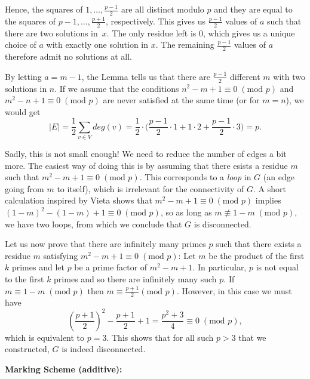 {Hence, the squares of $1, \dots, \frac{p-1}{2}$ are all distinct modulo $p$ and they are equal to the squares of $p-1, \dots, \frac{p+1}{2}$, respectively. This gives us $\frac{p-1}{2}$ values of $a$ such that there are two solutions \mbox{in $x$}.
The only residue left is $0$, which gives us a unique choice of $a$ with exactly one solution in $x$. The remaining $\frac{p-1}{2}$ values of $a$ therefore admit no solutions at all.

By letting $a = m-1$, the Lemma tells us that there are $\frac{p-1}{2}$ different $m$ with two solutions in $n$. If we assume that the conditions $n^2-m+1 \equiv 0 \; (\text{mod } p)$ and $m^2-n+1 \equiv 0 \; (\text{mod } p)$ are never satisfied at the same time (or for $m=n$), we would get
\[
\vert E \vert = \frac{1}{2} \sum_{v \in V} deg(v) = \frac{1}{2} \cdot  \bigg(\frac{p-1}{2}\cdot 1 + 1 \cdot 2 + \frac{p-1}{2} \cdot 3 \bigg) = p.
\]

Sadly, this is not small enough! We need to reduce the number of edges a bit more. The easiest way of doing this is by assuming that there esists a residue $m$ such that $m^2-m+1 \equiv 0 \; (\text{mod } p)$. This corresponds to a \emph{loop} in $G$ (an edge going from $m$ to itself), which is irrelevant for the connectivity of $G$. A short calculation inspired by Vieta shows that $m^2-m+1 \equiv 0 \; (\text{mod } p)$ implies $(1-m)^2-(1-m)+1 \equiv 0 \; (\text{mod } p)$, so as long as $m \nequiv 1-m \; (\text{mod } p)$, we have two loops, from which we conclude that $G$ is disconnected.

Let us now prove that there are infinitely many primes $p$ such that there exists a residue $m$ satisfying $m^2-m+1 \equiv 0 \; (\text{mod } p)$:
Let $m$ be the product of the first $k$ primes and let $p$ be a prime factor of $m^2-m+1$. In particular, $p$ is not equal to the first $k$ primes and so there are infinitely many such $p$.
If $m \equiv 1-m \; (\text{mod } p)$ then $m \equiv \frac{p+1}{2} (\text{mod } p)$. However, in this case we must have
\[
\left( \frac{p+1}{2} \right)^2 - \frac{p+1}{2} + 1 = \frac{p^2+3}{4} \equiv 0 \; (\text{mod } p),
\]
which is equivalent to $p=3$. This shows that for all such $p>3$ that we constructed, $G$ is indeed disconnected.

\textbf{Marking Scheme (additive):}

}
